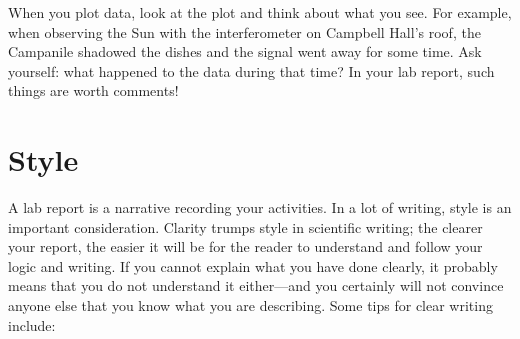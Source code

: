 \documentclass[12pt,preprint]{aastex}
\begin{document}
\noindent
When you plot  data, look at the plot and think
          about what you see.  For example, when observing the Sun with
          the interferometer on Campbell Hall's roof, the Campanile
          shadowed the dishes and the signal went away for some time.
          Ask yourself: what happened to the data during that time? In
          your lab report, such things are worth comments!


\section{Style}

\noindent
A lab report is a narrative recording your activities. In a lot of writing, style is an important consideration. Clarity trumps style in scientific writing; the clearer your report, the easier it will be for the reader to understand and follow your logic and writing. If you cannot explain what you have done clearly, it probably means that you do not understand it either—and you certainly will not convince anyone else that you know what you are describing. Some tips for clear writing include:
\end{document}
